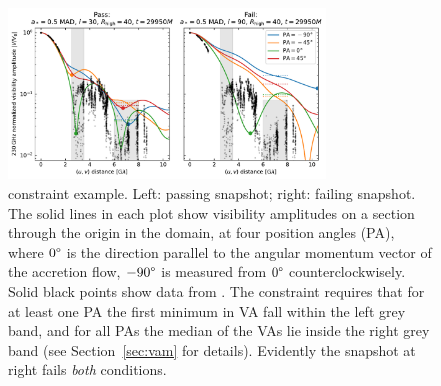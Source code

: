 \begin{figure}
  \centering
  \includegraphics[width=0.75\textwidth]{figures/passfail_va.pdf}
  \caption{\vam constraint example.  Left: passing snapshot; right: failing snapshot.  The solid lines in each plot show visibility amplitudes on a section through the origin in the \uv domain, at four position angles (PA), where $0\degree$ is the direction parallel to the angular momentum vector of the accretion flow, $-90\degree$ is measured from $0\degree$ counterclockwisely.  Solid black points show data from \aprilvii.  The \vam constraint requires that for at least one PA the first minimum in VA fall within the left grey band, and for all PAs the median of the VAs lie inside the right grey band (see Section~\ref{sec:vam} for details).  Evidently the snapshot at right fails {\em both} conditions.
  }
  \label{fig:passfail_va}
\end{figure}

